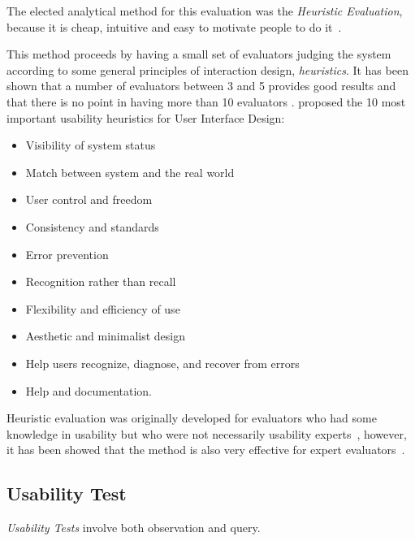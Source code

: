\documentclass[a4paper]{article}
\begin{document}
The elected analytical method for this evaluation was the \emph{Heuristic Evaluation}, because it is cheap, intuitive and easy to motivate people to do it~\citep{nielsen1990heuristic}.

This method proceeds by having a small set of evaluators judging the system according to some general principles of interaction design, \emph{heuristics}. It has been shown that a number of evaluators between 3 and 5 provides good results and that there is no point in having more than 10 evaluators \citep{nielsen1990heuristic}. \citet{nielsen1995ten} proposed the 10 most important usability heuristics for User Interface Design:

\begin{itemize}
	\item Visibility of system status

	\item Match between system and the real world

	\item User control and freedom

	\item Consistency and standards

	\item Error prevention

	\item Recognition rather than recall

	\item Flexibility and efficiency of use

	\item Aesthetic and minimalist design

	\item Help users recognize, diagnose, and recover from errors

	\item Help and documentation.
\end{itemize}

Heuristic evaluation was originally developed for evaluators who had some knowledge in usability but who were not necessarily usability experts~\citep{nielsen1990heuristic}, however, it has been showed that the method is also very effective for expert evaluators~\citep{nielsen1992finding}.  


\subsection{Usability Test}

\emph{Usability Tests} involve both observation and query.
\end{document}
